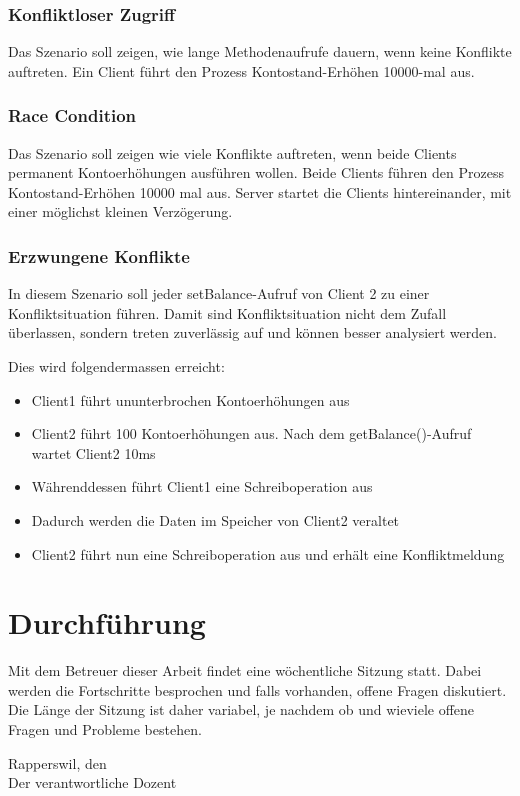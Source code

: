 \documentclass{article}
\begin{document}
\subsubsection{Konfliktloser Zugriff}
\label{sec:konfl-zugr}

Das Szenario soll zeigen, wie lange Methodenaufrufe dauern, wenn keine Konflikte auftreten. Ein Client führt den Prozess Kontostand-Erhöhen 10000-mal aus.

\subsubsection{Race Condition}
\label{sec:race-condition}
Das Szenario soll zeigen wie viele Konflikte auftreten, wenn beide Clients permanent Kontoerhöhungen ausführen wollen.
Beide Clients führen den Prozess Kontostand-Erhöhen 10000 mal aus. Server startet die Clients hintereinander, mit einer möglichst kleinen Verzögerung.

\subsubsection{Erzwungene Konflikte}
\label{sec:erzwungene-konflikte}

In diesem Szenario soll jeder setBalance-Aufruf von Client 2 zu einer Konfliktsituation führen. Damit sind Konfliktsituation nicht dem Zufall überlassen, sondern treten zuverlässig auf und können besser analysiert werden.

Dies wird folgendermassen erreicht:
\begin{itemize}
\item Client1 führt ununterbrochen Kontoerhöhungen aus
\item Client2 führt 100 Kontoerhöhungen aus. Nach dem getBalance()-Aufruf wartet Client2 10ms
\item Währenddessen führt Client1 eine Schreiboperation aus
\item Dadurch werden die Daten im Speicher von Client2 veraltet
\item Client2 führt nun eine Schreiboperation aus und erhält eine Konfliktmeldung
\end{itemize}

\section{Durchführung}
Mit dem Betreuer dieser Arbeit findet eine wöchentliche Sitzung statt. Dabei werden die Fortschritte besprochen und falls vorhanden, offene Fragen diskutiert. Die Länge der Sitzung ist daher variabel, je nachdem ob und wieviele offene Fragen und Probleme bestehen.


\vspace{1cm}

\noindent Rapperswil, den\\
Der verantwortliche Dozent\\
\end{document}
